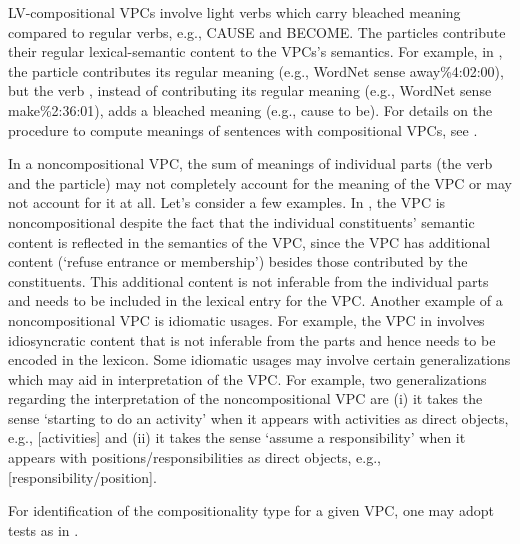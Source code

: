 \documentclass[output=paper,modfonts,nonflat]{langsci/langscibook}
\begin{document}
LV-compositional VPCs involve light verbs which carry bleached meaning compared to regular verbs, e.g., CAUSE and BECOME. The particles contribute their regular lexical-semantic content to the VPCs's semantics.  For example, in , the particle  contributes its regular meaning (e.g., WordNet sense away\%4:02:00), but the verb , instead of contributing its regular meaning (e.g., WordNet sense make\%2:36:01), adds a bleached meaning (e.g., cause to be). For details on the procedure to compute meanings of sentences with compositional VPCs, see .

In a noncompositional VPC, the sum of meanings of individual parts (the verb and the particle) may not completely account for the meaning of the VPC or may not account for it at all. Let's consider a few examples. In , the VPC  is noncompositional  despite the fact that the individual constituents' semantic content is reflected in the semantics of the VPC, since the VPC has additional content (`refuse entrance or membership') besides those contributed by the constituents. This additional content is not inferable from the individual parts and needs to be included in the lexical entry for the VPC. Another example of a noncompositional VPC is idiomatic usages. For example, the VPC  in  involves idiosyncratic content that is not inferable from the parts and hence needs to be encoded in the lexicon. Some idiomatic usages may involve certain generalizations which may aid in interpretation of the VPC. For example, two generalizations regarding the interpretation of the noncompositional VPC  are (i) it takes the sense `starting to do an activity' when it appears with activities as direct objects, e.g.,  [activities] and (ii) it takes the sense `assume a responsibility' when it appears with positions/responsibilities as direct objects, e.g.,  [responsibility/position]. 

For identification of the compositionality type for a given VPC, one may adopt tests as in .
\end{document}
